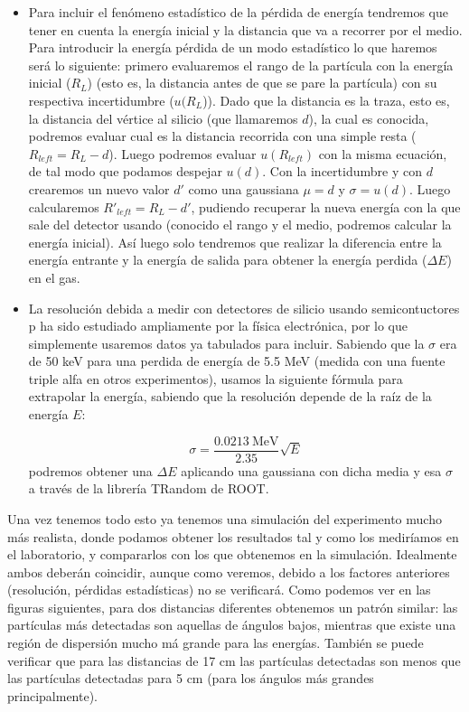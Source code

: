 \documentclass[12pt,a4paper]{article}
\numberwithin{equation}{section}
\numberwithin{figure}{section}
\begin{document}
\begin{itemize}
    \item Para incluir el fenómeno estadístico de la pérdida de energía tendremos que tener en cuenta la energía inicial y la distancia que va a recorrer por el medio. Para introducir la energía pérdida de un modo estadístico lo que haremos será lo siguiente: primero evaluaremos el rango de la partícula con la energía inicial ($R_L$) (esto es, la distancia antes de que se pare la partícula) con su respectiva incertidumbre ($u(R_L$)). Dado que la distancia es la traza, esto es, la distancia del vértice al silicio (que llamaremos $d$), la cual es conocida, podremos evaluar cual es la distancia recorrida con una simple resta ($R_{left}=R_L-d$). Luego podremos evaluar $u(R_{left})$ con la misma ecuación, de tal modo que podamos despejar $u(d)$. Con la incertidumbre y con $d$ crearemos un nuevo valor $d'$ como una gaussiana $\mu=d$ y $\sigma=u(d)$. Luego calcularemos $R'_{left}=R_{L}-d'$, pudiendo recuperar la nueva energía con la que sale del detector usando (conocido el rango y el medio, podremos calcular la energía inicial). Así luego solo tendremos que realizar la diferencia entre la energía entrante y la energía de salida para obtener la energía perdida ($\Delta E$) en el gas. 
    
    \item La resolución debida a medir con detectores de silicio usando semicontuctores p ha sido estudiado ampliamente por la física electrónica, por lo que simplemente usaremos datos ya tabulados para incluir. Sabiendo que la $\sigma$ era de 50 keV para una perdida de energía de 5.5 MeV (medida con una fuente triple alfa en otros experimentos), usamos la siguiente fórmula para extrapolar la energía, sabiendo que la resolución depende de la raíz de la energía $E$: 
    
    \begin{equation}
        \sigma = \frac{0.0213 \  \text{MeV}}{2.35} \sqrt{E}
    \end{equation}
    podremos obtener una $\Delta E$ aplicando una gaussiana con dicha media y esa $\sigma$ a través de la librería TRandom de ROOT. 

\end{itemize}




Una vez tenemos todo esto ya tenemos una simulación del experimento mucho más realista, donde podamos obtener los resultados tal y como los mediríamos en el laboratorio, y compararlos con los que obtenemos en la simulación. Idealmente ambos deberán coincidir, aunque como veremos, debido a los factores anteriores (resolución, pérdidas estadísticas) no se verificará. Como podemos ver en las figuras siguientes, para dos distancias diferentes obtenemos un patrón similar: las partículas más detectadas son aquellas de ángulos bajos, mientras que existe una región de dispersión mucho má grande para las energías. También se puede verificar que para las distancias de 17 cm las partículas detectadas son menos que las partículas detectadas para 5 cm (para los ángulos más grandes principalmente). 
\end{document}
